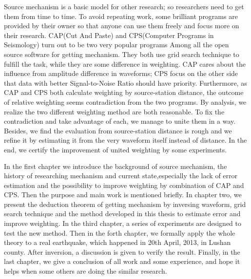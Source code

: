 \begin{enabstract}
Source mechanism is a basic model for other research; so researchers need to get them from time to time. To avoid repeating work, some brilliant programs are provided by their owner so that anyone can use them freely and focus more on their research. CAP(Cut And Paste) and CPS(Computer Programs in Seismology) turn out to be two very popular programs Among all the open source software for getting mechanism. They both use grid search technique to fulfill the task, while they are some difference in weighting. CAP cares about the influence from amplitude difference in waveforms; CPS focus on the other side that data with better Signal-to-Noise Ratio should have priority. Furthermore, as CAP and CPS both calculate weighting by source-station distance, the outcome of relative weighting seems contradiction from the two programs. By analysis, we realize the two different weighting method are both reasonable. To fix the contradiction and take advantage of each, we manage to unite them in a way. Besides, we find the evaluation from source-station distance is rough and we refine it by estimating it from the very waveform itself instead of distance. In the end, we certify the improvement of united weighting by some experiments.

In the first chapter we introduce the background of source mechanism, the history of researching mechanism and current state,especially the lack of error estimation and the possibility to improve weighting by combination of CAP and CPS. Then the purpose and main work is mentioned briefly. In chapter two, we present the deduction theorem of getting mechanism by inversing waveform, grid search technique and the method developed in this thesis to estimate error and improve weighting. In the third chapter, a series of experiments are designed to test the new method. Then in the forth chapter, we formally apply the whole theory to a real earthquake, which happened in 20th April, 2013, in Lushan county. After inversion, a discussion is given to verify the result. Finally, in the last chapter, we give a conclusion of all work and some experience, and hope it helps when some others are doing the similar research.




\end{enabstract}
\vspace{1em}\par\vfill



